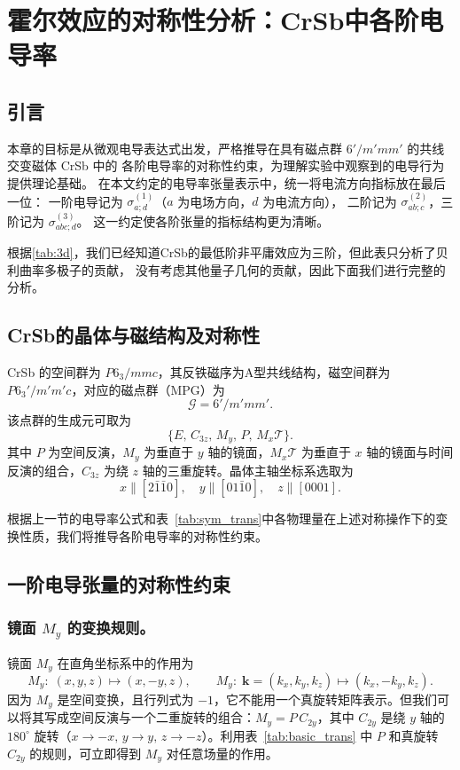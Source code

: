 
\chapter{霍尔效应的对称性分析：CrSb中各阶电导率}

\section{引言}
本章的目标是从微观电导表达式出发，严格推导在具有磁点群 $6'/m'mm'$ 的共线交变磁体 CrSb 中的
各阶电导率的对称性约束，为理解实验中观察到的电导行为提供理论基础。
在本文约定的电导率张量表示中，统一将电流方向指标放在最后一位：
一阶电导记为 $\sigma_{a;d}^{(1)}$（$a$ 为电场方向，$d$ 为电流方向），
二阶记为 $\sigma_{ab;c}^{(2)}$，三阶记为 $\sigma_{abc;d}^{(3)}$。
这一约定使各阶张量的指标结构更为清晰。

根据\ref{tab:3d}，我们已经知道CrSb的最低阶非平庸效应为三阶，但此表只分析了贝利曲率多极子的贡献，
没有考虑其他量子几何的贡献，因此下面我们进行完整的分析。

\section{CrSb的晶体与磁结构及对称性}
CrSb 的空间群为 $P6_3/mmc$，其反铁磁序为A型共线结构，磁空间群为 $P6_3'/m'm'c$，对应的磁点群（MPG）为
\[
\mathcal{G} = 6'/m'mm' .
\]
该点群的生成元可取为
\[
\{E,\, C_{3z},\, M_y,\, P,\, M_x\mathcal{T}\} .
\]
其中 $P$ 为空间反演，$M_y$ 为垂直于 $y$ 轴的镜面，$M_x\mathcal{T}$ 为垂直于 $x$ 轴的镜面与时间反演的组合，$C_{3z}$ 为绕 $z$ 轴的三重旋转。晶体主轴坐标系选取为
\[
x\parallel[2\bar{1}\bar{1}0],\quad y\parallel[01\bar{1}0],\quad z\parallel[0001].
\]

根据上一节的电导率公式和表~\ref{tab:sym_trans}中各物理量在上述对称操作下的变换性质，我们将推导各阶电导率的对称性约束。

\section{一阶电导张量的对称性约束}

\subsection{镜面 \(M_y\) 的变换规则。}
镜面 \(M_y\) 在直角坐标系中的作用为
\[
M_y: \; (x, y, z) \mapsto (x, -y, z), \qquad 
M_y: \; \mathbf{k} = (k_x, k_y, k_z) \mapsto (k_x, -k_y, k_z).
\]
因为 \(M_y\) 是空间变换，且行列式为 \(-1\)，它不能用一个真旋转矩阵表示。但我们可以将其写成空间反演与一个二重旋转的组合：\(M_y = P \, C_{2y}\)，其中 \(C_{2y}\) 是绕 \(y\) 轴的 \(180^\circ\) 旋转（\(x\to -x,\, y\to y,\, z\to -z\)）。利用表~\ref{tab:basic_trans} 中 \(P\) 和真旋转 \(C_{2y}\) 的规则，可立即得到 \(M_y\) 对任意场量的作用。

